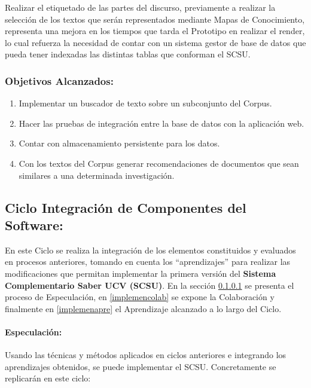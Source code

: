 \documentclass[
  12pt,
  openany]{book}
\begin{document}
Realizar el etiquetado de las partes del discurso, previamente a realizar la selección de los textos que serán representados mediante Mapas de Conocimiento, representa una mejora en los tiempos que tarda el Prototipo en realizar el render, lo cual refuerza la necesidad de contar con un sistema gestor de base de datos que pueda tener indexadas las distintas tablas que conforman el SCSU.

\hypertarget{objetivos-alcanzados-1}{%
\subsubsection{Objetivos Alcanzados:}\label{objetivos-alcanzados-1}}

\begin{enumerate}
\def\labelenumi{\arabic{enumi}.}
\item
  Implementar un buscador de texto sobre un subconjunto del Corpus.
\item
  Hacer las pruebas de integración entre la base de datos con la aplicación web.
\item
  Contar con almacenamiento persistente para los datos.
\item
  Con los textos del Corpus generar recomendaciones de documentos que sean similares a una determinada investigación.
\end{enumerate}

\hypertarget{desarrollociclos4}{%
\subsection{Ciclo Integración de Componentes del Software:}\label{desarrollociclos4}}

En este Ciclo se realiza la integración de los elementos constituidos y evaluados en procesos anteriores, tomando en cuenta los ``aprendizajes'' para realizar las modificaciones que permitan implementar la primera versión del \textbf{Sistema Complementario Saber UCV (SCSU)}. En la sección \ref{implemenesp} se presenta el proceso de Especulación, en \ref{implemencolab} se expone la Colaboración y finalmente en \ref{implemenapre} el Aprendizaje alcanzado a lo largo del Ciclo.

\hypertarget{implemenesp}{%
\paragraph{Especulación:}\label{implemenesp}}

Usando las técnicas y métodos aplicados en ciclos anteriores e integrando los aprendizajes obtenidos, se puede implementar el SCSU. Concretamente se replicarán en este ciclo:
\end{document}
